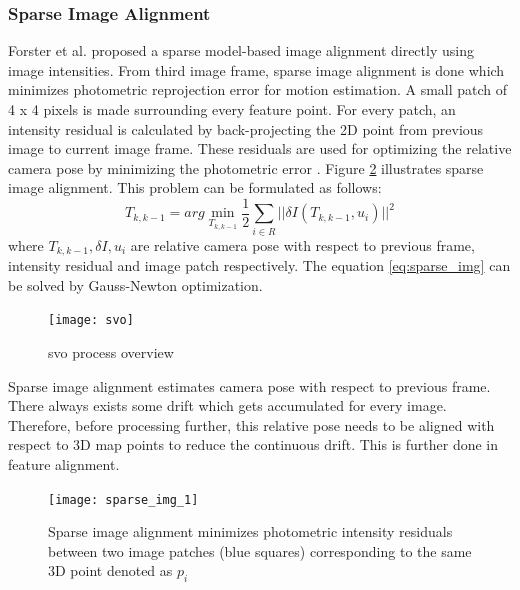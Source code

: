 \subsubsection{Sparse Image Alignment}
Forster et al.\cite{Forster2014ICRA} proposed a sparse model-based image alignment directly using image intensities. From third image frame, sparse image alignment is done which minimizes photometric reprojection error for motion estimation. A small patch of 4 x 4 pixels is made surrounding every feature point. For every patch, an intensity residual is calculated by back-projecting the 2D point from previous image to current image frame. These residuals are used for optimizing the relative camera pose by minimizing the photometric error \cite{Forster2014ICRA}. Figure \ref{fig:sparse_img_1} illustrates sparse image alignment. This problem can be formulated as follows:
\begin{equation*}
T_{k,k-1} = arg \min\limits_{T_{k,k-1}} \frac{1}{2} \sum\limits_{i \in R} || \delta I (T_{k,k-1}, u_{i})||^{2}
\label{eq:sparse_img}
\end{equation*}
\noindent where $T_{k,k-1}, \delta I, u_{i} $ are relative camera pose with respect to previous frame, intensity residual and image patch respectively. The equation \ref{eq:sparse_img} can be solved by Gauss-Newton optimization. \\
\begin{figure}[H]
	\centering
	\texttt{[image: svo]}
	\caption{\acrshort{svo} process overview \cite{Forster2014ICRA}}
	\label{fig:svo}
\end{figure}
\noindent Sparse image alignment estimates camera pose with respect to previous frame. There always exists some drift which gets accumulated for every image. Therefore, before processing further, this relative pose needs to be aligned with respect to 3D map points to reduce the continuous drift. This is further done in feature alignment.
\begin{figure}[h!]
	\centering
	\texttt{[image: sparse\_img\_1]}
	\caption{Sparse image alignment minimizes photometric intensity residuals between two image patches (blue squares) corresponding to the same 3D point denoted as $ p_{i}$ \cite{Forster2014ICRA}}
	\label{fig:sparse_img_1}
\end{figure}
